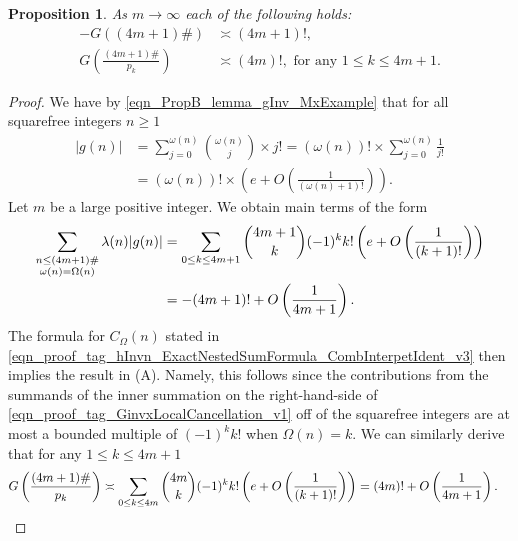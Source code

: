 \documentclass[11pt,reqno,a4letter]{article}
\numberwithin{equation}{section}
\numberwithin{figure}{section}
\numberwithin{table}{section}
\theoremstyle{plain}
\newtheorem{prop}[theorem]{Proposition}
\numberwithin{theorem}{section}
\theoremstyle{definition}
\begin{document}
\begin{prop}
\label{theorem_PrimorialSeqGInvCalcs_v1} 
As $m \rightarrow \infty$ each of the following holds: 
\begin{align} 
\tag{A} 
-G((4m+1)\#) & \asymp (4m+1)!, \\ 
\tag{B} 
G\left(\frac{(4m+1)\#}{p_k}\right) & \asymp (4m)!, 
     \text{ for any } 1 \leq k \leq 4m+1. 
\end{align} 
\end{prop}
\begin{proof} 
We have by \eqref{eqn_PropB_lemma_gInv_MxExample} 
that for all squarefree integers $n \geq 1$ 
\begin{align*} 
|g(n)| & = \sum_{j=0}^{\omega(n)} \binom{\omega(n)}{j} \times j! 
     = (\omega(n))! \times \sum_{j=0}^{\omega(n)} \frac{1}{j!} \\ 
     & = (\omega(n))! \times \left(e + O\left(\frac{1}{(\omega(n)+1)!}\right)\right). 
\end{align*} 
Let $m$ be a large positive integer. 
We obtain main terms of the form 
\begin{align} 
\label{eqn_proof_tag_GinvxLocalCancellation_v1} 
\sum_{\substack{n \leq (4m+1)\# \\ \omega(n)=\Omega(n)}} \lambda(n) |g(n)| 
     & = \sum_{0 \leq k \leq 4m+1} \binom{4m+1}{k} (-1)^{k} k! 
     \left(e + O\left(\frac{1}{(k+1)!}\right)\right) \\ 
\notag 
     & = -(4m+1)! + O\left(\frac{1}{4m+1}\right). 
\end{align} 
The formula for $C_{\Omega}(n)$ stated in 
\eqref{eqn_proof_tag_hInvn_ExactNestedSumFormula_CombInterpetIdent_v3} 
then implies the result in (A). 
Namely, this follows since the contributions from the summands of the inner 
summation on the right-hand-side of 
\eqref{eqn_proof_tag_GinvxLocalCancellation_v1} 
off of the squarefree integers 
are at most a bounded multiple of $(-1)^k k!$ when $\Omega(n) = k$. 
We can similarly derive that for any $1 \leq k \leq 4m+1$ 
\begin{align*}
G\left(\frac{(4m+1)\#}{p_k}\right) & \asymp \sum_{0 \leq k \leq 4m} \binom{4m}{k} (-1)^{k} k! 
     \left(e + O\left(\frac{1}{(k+1)!}\right)\right) = (4m)! + O\left(\frac{1}{4m+1}\right). 
     \qedhere 
\end{align*}
\end{proof}
\end{document}
